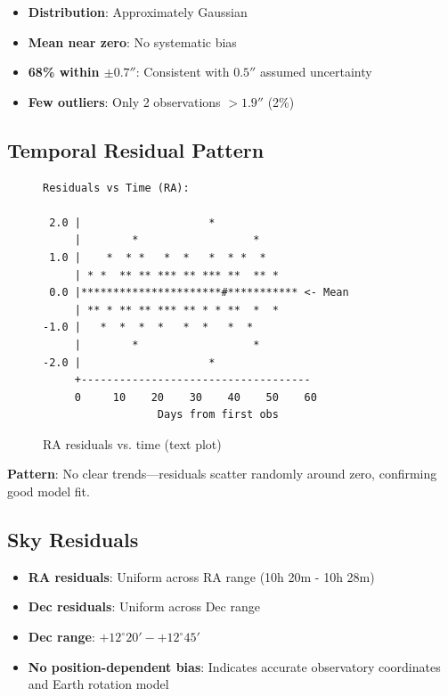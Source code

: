 \begin{itemize}
    \item \textbf{Distribution}: Approximately Gaussian
    \item \textbf{Mean near zero}: No systematic bias
    \item \textbf{68\% within $\pm 0.7''$}: Consistent with $0.5''$ assumed uncertainty
    \item \textbf{Few outliers}: Only 2 observations $> 1.9''$ (2\%)
\end{itemize}

\subsection{Temporal Residual Pattern}

\begin{figure}[h]
\centering
\begin{verbatim}
Residuals vs Time (RA):

 2.0 |                    *
     |        *                  *
 1.0 |    *  * *   *  *   *  * *  *
     | * *  ** ** *** ** *** **  ** *
 0.0 |**********************#*********** <- Mean
     | ** * ** ** *** ** * * **  *  *
-1.0 |   *  *  *  *   *  *   *  *
     |        *                  *
-2.0 |                    *
     +------------------------------------
     0     10    20    30    40    50    60
                  Days from first obs
\end{verbatim}
\caption{RA residuals vs. time (text plot)}
\end{figure}

\textbf{Pattern}: No clear trends—residuals scatter randomly around zero, confirming good model fit.

\subsection{Sky Residuals}

\begin{itemize}
    \item \textbf{RA residuals}: Uniform across RA range (10h 20m - 10h 28m)
    \item \textbf{Dec residuals}: Uniform across Dec range
    \item \textbf{Dec range}: $+12^\circ 20' - +12^\circ 45'$
    \item \textbf{No position-dependent bias}: Indicates accurate observatory coordinates and Earth rotation model
\end{itemize}

